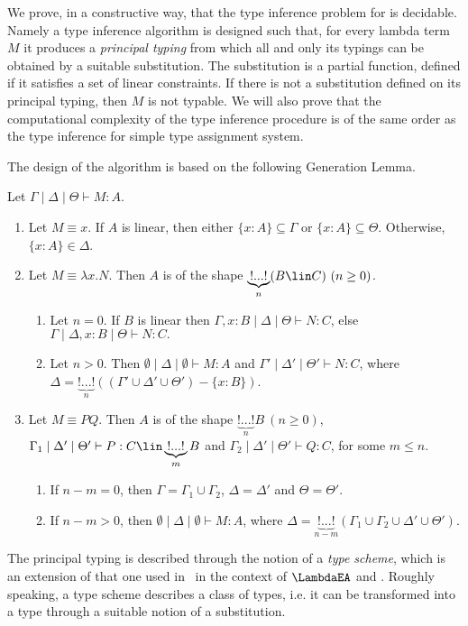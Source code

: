 We prove, in a constructive way, that the type inference problem for
\ETAS{} is decidable. Namely a type inference algorithm is
designed such that, for every lambda term $M$ it produces
a \emph{principal typing} from which all and only its typings can be
obtained by a suitable substitution. The substitution is a partial
function, defined if it satisfies a set of linear constraints.  If
there is not a substitution defined on its principal typing, then $M$
is not typable.  We will also prove that the computational complexity
of the type inference procedure is of the same order as the type
inference for simple type assignment system.

The design of the algorithm is based on the following Generation Lemma.
\begin{lem} 
Let $\Gamma \mid \Delta \mid \Theta \vdash M:A$.
 \begin{enumerate}[\em i)]
\item Let $M\equiv x.$ If $A$ is linear, then either $\{x:A\} \subseteq \Gamma$ or $\{x:A\} 
\subseteq \Theta$. 
Otherwise, $\{x:A\}\in \Delta$.
\item Let $M \equiv \lambda x.N$. Then $A$ is of the shape $\underbrace{!...!}_{n}(B \lin C) 
\ (n \geq 0)   $.
\begin{enumerate}[$\bullet$]
\item Let $n=0$. If $B$ is linear then $\Gamma,x:B \mid \Delta \mid \Theta \vdash N:C$, else
$\Gamma \mid \Delta,x:B \mid \Theta \vdash N:C.$ 
\item Let $n >0$. Then $\emptyset \mid \Delta \mid \emptyset \vdash M:A$ and
$\Gamma' \mid \Delta' \mid \Theta' \vdash N:C$, where 
$\Delta = \underbrace{!...!}_{n}((\Gamma' \cup \Delta' \cup \Theta')-\{x:B\}  )   $.   
\end{enumerate}
\item Let $M \equiv PQ$. Then $A$ is of the shape $\underbrace{!...!}_{n}B  \ (n \geq 0)   $,
$\Gamma_{1}  \mid \Delta' \mid \Theta' \vdash P: C \lin \underbrace{!...!}_{m}B$ and  
$\Gamma_{2}  \mid \Delta' \mid \Theta' \vdash Q:C$, for some $m \leq n$.
\begin{enumerate}[\em(a)]
\item If $n-m=0$, then $\Gamma=\Gamma_{1}\cup \Gamma_{2}  $, $\Delta=\Delta'$ and $\Theta =\Theta'$.
\item If $n-m>0$, then $\emptyset \mid \Delta \mid \emptyset \vdash M:A$, where
$\Delta = \underbrace{!...!}_{n-m}( \Gamma_{1}\cup \Gamma_{2}\cup \Delta' \cup \Theta'  )  $.      
\end{enumerate}
 \end{enumerate}
 \end{lem}  
\noindent The principal typing is described through the notion of a
 \emph{type scheme}, which is an extension of that one used in~\cite{Coppola03tlca} in
 the context of $\LambdaEA$ and \NEAL.  Roughly speaking, a type scheme
 describes a class of types, i.e.  it can be transformed into a type
 through a suitable notion of a substitution.

